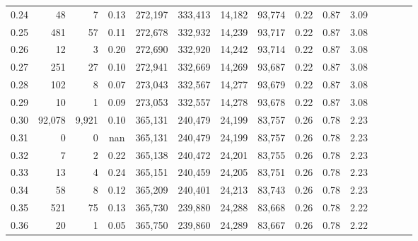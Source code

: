 \begin{tabular}{rrrcrrrrrrrrrrr}
0.24 &      48 &       7 &                                       0.13 &  272,197 &  333,413 &   14,182 &   93,774 &  0.22 &  0.87 &                         3.09 \\
0.25 &     481 &      57 &                                       0.11 &  272,678 &  332,932 &   14,239 &   93,717 &  0.22 &  0.87 &                         3.08 \\
0.26 &      12 &       3 &                                       0.20 &  272,690 &  332,920 &   14,242 &   93,714 &  0.22 &  0.87 &                         3.08 \\
0.27 &     251 &      27 &                                       0.10 &  272,941 &  332,669 &   14,269 &   93,687 &  0.22 &  0.87 &                         3.08 \\
0.28 &     102 &       8 &                                       0.07 &  273,043 &  332,567 &   14,277 &   93,679 &  0.22 &  0.87 &                         3.08 \\
0.29 &      10 &       1 &                                       0.09 &  273,053 &  332,557 &   14,278 &   93,678 &  0.22 &  0.87 &                         3.08 \\
0.30 &  92,078 &   9,921 &                                       0.10 &  365,131 &  240,479 &   24,199 &   83,757 &  0.26 &  0.78 &                         2.23 \\
0.31 &       0 &       0 &                                        nan &  365,131 &  240,479 &   24,199 &   83,757 &  0.26 &  0.78 &                         2.23 \\
0.32 &       7 &       2 &                                       0.22 &  365,138 &  240,472 &   24,201 &   83,755 &  0.26 &  0.78 &                         2.23 \\
0.33 &      13 &       4 &                                       0.24 &  365,151 &  240,459 &   24,205 &   83,751 &  0.26 &  0.78 &                         2.23 \\
0.34 &      58 &       8 &                                       0.12 &  365,209 &  240,401 &   24,213 &   83,743 &  0.26 &  0.78 &                         2.23 \\
0.35 &     521 &      75 &                                       0.13 &  365,730 &  239,880 &   24,288 &   83,668 &  0.26 &  0.78 &                         2.22 \\
0.36 &      20 &       1 &                                       0.05 &  365,750 &  239,860 &   24,289 &   83,667 &  0.26 &  0.78 &                         2.22 \\

\end{tabular}
